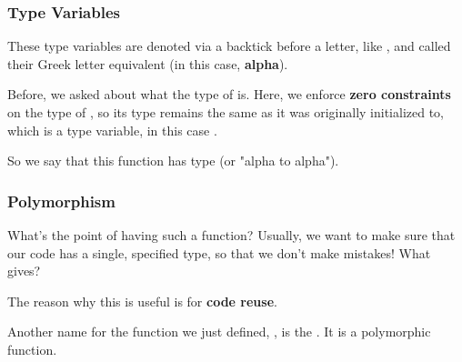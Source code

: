 \documentclass[aspectratio=169]{beamer}
\begin{document}
\begin{frame}[fragile]
  \frametitle{Type Variables}

  These type variables are denoted via a backtick before a letter, like
  , and called their Greek letter equivalent (in this case, \textbf{alpha}).

  \pause
  \vspace{\fill}

  Before, we asked about what the type of  is. Here, we enforce
  \textbf{zero constraints} on the type of , so its type remains the same
  as it was originally initialized to, which is a type variable, in this case .

  \pause
  \vspace{\fill}

  So we say that this function has type  (or "alpha to alpha").
\end{frame}

\begin{frame}[fragile]
  \frametitle{Polymorphism}

  What's the point of having such a function? Usually, we want to make sure that
  our code has a single, specified type, so that we don't make mistakes! What gives?

  \pause
  \vspace{\fill}

  The reason why this is useful is for \textbf{code reuse}.

  \pause
  \vspace{\fill}


  \pause
  \vspace{\fill}

  Another name for the function we just defined, , is the
  . It is a polymorphic function.
\end{frame}
\end{document}
